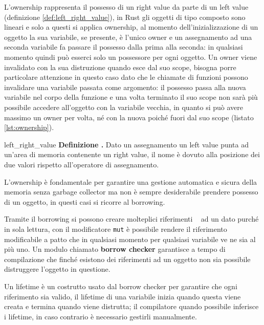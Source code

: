 \documentclass[Lau,binding=0.6cm]{sapthesis}
\newenvironment{myDefinition}[2]{ \begin{Definizione}[adjusted title=#1]{}{#2}
    \textbf{Definizione \thetcbcounter.} }{\end{Definizione}}
\newcommand{\textcode}[1]{\colorbox{backcolour}{\texttt{#1}}}
\begin{document}
L'ownership rappresenta il possesso di un right value da parte di un left value (definizione \ref{def:left_right_value}), in Rust gli oggetti di tipo composto sono lineari e solo a questi si applica ownership, al momento dell'inizializzazione di un oggetto la sua variabile, se presente, è l'unico owner e un assegnamento ad una seconda variabile fa passare il possesso dalla prima alla seconda: in qualsiasi momento quindi può esserci solo un possessore per ogni oggetto. 
Un owner viene invalidato con la sua distruzione quando esce dal suo scope, bisogna porre particolare attenzione in questo caso dato che le chiamate di funzioni possono invalidare una variabile passata come argomento: il possesso passa alla nuova variabile nel corpo della funzione e una volta terminato il suo scope non sarà più possibile accedere all'oggetto con la variabile vecchia, in quanto si può avere massimo un owner per volta, né con la nuova poiché fuori dal suo scope (listato \ref{lst:ownership}). 



\begin{myDefinition}{Left e Right value}{left_right_value}
    Dato un assegnamento un left value punta ad un'area di memoria contenente un right value, il nome è dovuto alla posizione dei due valori rispetto all'operatore di assegnamento. 
\end{myDefinition}

L'ownership è fondamentale per garantire una gestione automatica e sicura della memoria senza garbage collector ma non è sempre desiderabile prendere possesso di un oggetto, in questi casi si ricorre al borrowing.

Tramite il borrowing si possono creare molteplici  riferimenti ~\cite[4.2]{rust:language} ad un dato purché in sola lettura, con il modificatore \textcode{mut} è possibile rendere il riferimento modificabile a patto che in qualsiasi momento per qualsiasi variabile ve ne sia al più uno. 
Un modulo chiamato \textbf{borrow checker} garantisce a tempo di compilazione che finché esistono dei riferimenti ad un oggetto non sia possibile distruggere l'oggetto in questione. 



Un lifetime è un costrutto usato dal borrow checker per garantire che ogni riferimento sia valido, il lifetime di una variabile inizia quando questa viene creata e termina quando viene distrutta; il compilatore quando possibile inferisce i lifetime, in caso contrario è necessario gestirli manualmente.
\end{document}
